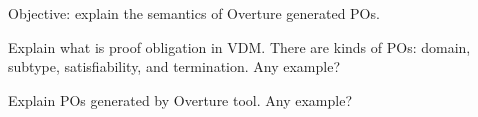 Objective: explain the semantics of Overture generated POs.

Explain what is proof obligation in VDM. There are kinds of POs: domain, subtype, satisfiability, and termination. Any example?

Explain POs generated by Overture tool. Any example?
